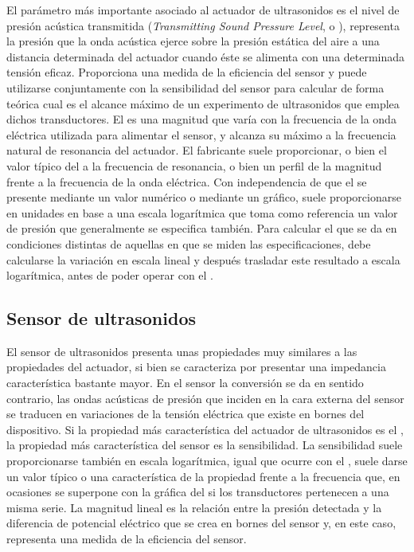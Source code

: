 El parámetro más importante asociado al actuador de ultrasonidos es el
nivel de presión acústica transmitida (\emph{Transmitting Sound Pressure
Level}, o ), representa la presión que la onda acústica ejerce
sobre la presión estática del aire a una distancia determinada del actuador
cuando éste se alimenta con una determinada tensión eficaz. Proporciona una
medida de la eficiencia del sensor y puede utilizarse conjuntamente con la
sensibilidad del sensor para calcular de forma teórica cual es el alcance
máximo de un experimento de ultrasonidos que emplea dichos transductores.
El  es una magnitud que varía con la frecuencia de la onda
eléctrica utilizada para alimentar el sensor, y alcanza su máximo a la
frecuencia natural de resonancia del actuador. El fabricante suele
proporcionar, o bien el valor típico del  a la frecuencia de
resonancia, o bien un perfil de la magnitud frente a la frecuencia de la
onda eléctrica. Con independencia de que el  se presente mediante
un valor numérico o mediante un gráfico, suele proporcionarse en unidades
en base a una escala logarítmica que toma como referencia un valor de
presión que generalmente se especifica también. Para calcular el 
que se da en condiciones distintas de aquellas en que se miden las
especificaciones, debe calcularse la variación en escala lineal y después
trasladar este resultado a escala logarítmica, antes de poder operar con el
.


\subsection{Sensor de ultrasonidos}

El sensor de ultrasonidos presenta unas propiedades muy similares a las
propiedades del actuador, si bien se caracteriza por presentar una
impedancia característica bastante mayor. En el sensor la conversión se da
en sentido contrario, las ondas acústicas de presión que inciden en la cara
externa del sensor se traducen en variaciones de la tensión eléctrica que
existe en bornes del dispositivo. Si la propiedad más característica del
actuador de ultrasonidos es el , la propiedad más característica
del sensor es la sensibilidad. La sensibilidad suele proporcionarse también
en escala logarítmica, igual que ocurre con el , suele darse un
valor típico o una característica de la propiedad frente a la frecuencia
que, en ocasiones se superpone con la gráfica del  si los
transductores pertenecen a una misma serie. La magnitud lineal es la
relación entre la presión detectada y la diferencia de potencial eléctrico
que se crea en bornes del sensor y, en este caso, representa una medida de
la eficiencia del sensor.


